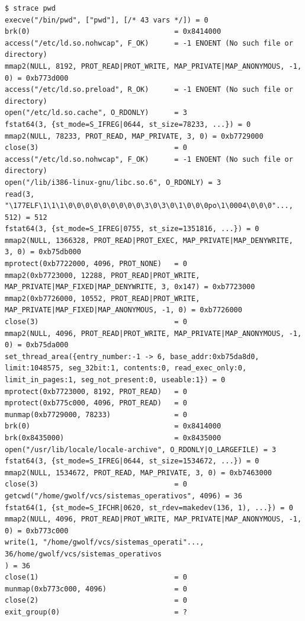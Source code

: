 \documentclass[11pt,fleqn]{book} %
\begin{document}
{\scriptsize

\begin{verbatim}
$ strace pwd
execve("/bin/pwd", ["pwd"], [/* 43 vars */]) = 0
brk(0)                                  = 0x8414000
access("/etc/ld.so.nohwcap", F_OK)      = -1 ENOENT (No such file or directory)
mmap2(NULL, 8192, PROT_READ|PROT_WRITE, MAP_PRIVATE|MAP_ANONYMOUS, -1, 0) = 0xb773d000
access("/etc/ld.so.preload", R_OK)      = -1 ENOENT (No such file or directory)
open("/etc/ld.so.cache", O_RDONLY)      = 3
fstat64(3, {st_mode=S_IFREG|0644, st_size=78233, ...}) = 0
mmap2(NULL, 78233, PROT_READ, MAP_PRIVATE, 3, 0) = 0xb7729000
close(3)                                = 0
access("/etc/ld.so.nohwcap", F_OK)      = -1 ENOENT (No such file or directory)
open("/lib/i386-linux-gnu/libc.so.6", O_RDONLY) = 3
read(3, "\177ELF\1\1\1\0\0\0\0\0\0\0\0\0\3\0\3\0\1\0\0\0po\1\0004\0\0\0"..., 512) = 512
fstat64(3, {st_mode=S_IFREG|0755, st_size=1351816, ...}) = 0
mmap2(NULL, 1366328, PROT_READ|PROT_EXEC, MAP_PRIVATE|MAP_DENYWRITE, 3, 0) = 0xb75db000
mprotect(0xb7722000, 4096, PROT_NONE)   = 0
mmap2(0xb7723000, 12288, PROT_READ|PROT_WRITE, MAP_PRIVATE|MAP_FIXED|MAP_DENYWRITE, 3, 0x147) = 0xb7723000
mmap2(0xb7726000, 10552, PROT_READ|PROT_WRITE, MAP_PRIVATE|MAP_FIXED|MAP_ANONYMOUS, -1, 0) = 0xb7726000
close(3)                                = 0
mmap2(NULL, 4096, PROT_READ|PROT_WRITE, MAP_PRIVATE|MAP_ANONYMOUS, -1, 0) = 0xb75da000
set_thread_area({entry_number:-1 -> 6, base_addr:0xb75da8d0, limit:1048575, seg_32bit:1, contents:0, read_exec_only:0, limit_in_pages:1, seg_not_present:0, useable:1}) = 0
mprotect(0xb7723000, 8192, PROT_READ)   = 0
mprotect(0xb775c000, 4096, PROT_READ)   = 0
munmap(0xb7729000, 78233)               = 0
brk(0)                                  = 0x8414000
brk(0x8435000)                          = 0x8435000
open("/usr/lib/locale/locale-archive", O_RDONLY|O_LARGEFILE) = 3
fstat64(3, {st_mode=S_IFREG|0644, st_size=1534672, ...}) = 0
mmap2(NULL, 1534672, PROT_READ, MAP_PRIVATE, 3, 0) = 0xb7463000
close(3)                                = 0
getcwd("/home/gwolf/vcs/sistemas_operativos", 4096) = 36
fstat64(1, {st_mode=S_IFCHR|0620, st_rdev=makedev(136, 1), ...}) = 0
mmap2(NULL, 4096, PROT_READ|PROT_WRITE, MAP_PRIVATE|MAP_ANONYMOUS, -1, 0) = 0xb773c000
write(1, "/home/gwolf/vcs/sistemas_operati"..., 36/home/gwolf/vcs/sistemas_operativos
) = 36
close(1)                                = 0
munmap(0xb773c000, 4096)                = 0
close(2)                                = 0
exit_group(0)                           = ?
\end{verbatim}
}
\end{document}
